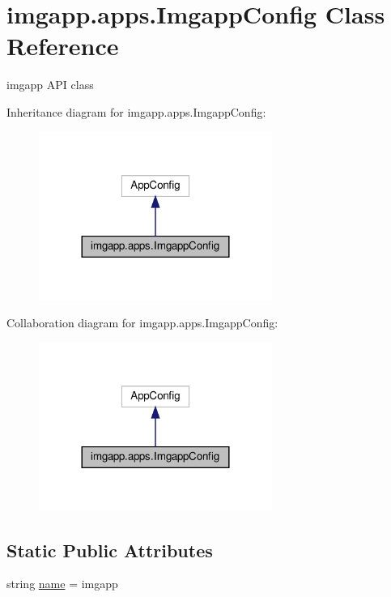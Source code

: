 \hypertarget{classimgapp_1_1apps_1_1ImgappConfig}{}\section{imgapp.\+apps.\+Imgapp\+Config Class Reference}
\label{classimgapp_1_1apps_1_1ImgappConfig}


imgapp A\+PI class  




Inheritance diagram for imgapp.\+apps.\+Imgapp\+Config\+:\nopagebreak
\begin{figure}[H]
\begin{center}
\leavevmode
\includegraphics[width=216pt]{classimgapp_1_1apps_1_1ImgappConfig__inherit__graph}
\end{center}
\end{figure}


Collaboration diagram for imgapp.\+apps.\+Imgapp\+Config\+:\nopagebreak
\begin{figure}[H]
\begin{center}
\leavevmode
\includegraphics[width=216pt]{classimgapp_1_1apps_1_1ImgappConfig__coll__graph}
\end{center}
\end{figure}
\subsection*{Static Public Attributes}
\begin{DoxyCompactItemize}
\item 
string \hyperlink{classimgapp_1_1apps_1_1ImgappConfig_a3eafdf46b561d2f3764888b9e7cfe9e5}{name} = \textquotesingle{}imgapp\textquotesingle{}
\end{DoxyCompactItemize}


